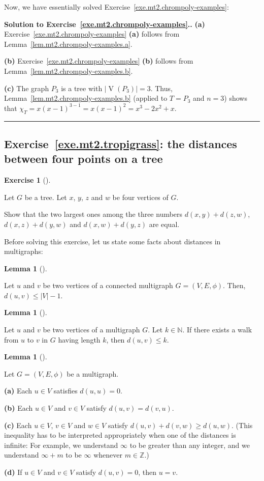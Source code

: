 \documentclass[numbers=enddot,12pt,final,onecolumn,notitlepage]{scrartcl}%
\newcounter{exer}
\theoremstyle{definition}
\newtheorem{lem}[theo]{Lemma}
\newenvironment{lemma}[1][]
{\begin{lem}[#1]\begin{leftbar}}
{\end{leftbar}\end{lem}}
\newtheorem{exmp}[exer]{Exercise}
\newenvironment{exercise}[1][]
{\begin{exmp}[#1]\begin{leftbar}}
{\end{leftbar}\end{exmp}}
\newenvironment{proof}[1][Proof]{\noindent\textbf{#1.} }{\ \rule{0.5em}{0.5em}}
\newcommand{\NN}{\mathbb{N}}
\newcommand{\ZZ}{\mathbb{Z}}
\newcommand{\abs}[1]{\left| #1 \right|}
\newcommand{\tup}[1]{\left( #1 \right)}
\newcommand{\verts}[1]{\operatorname{V}\left( #1 \right)}
\begin{document}
Now, we have essentially solved
Exercise~\ref{exe.mt2.chrompoly-examples}:

\begin{proof}[Solution to
Exercise~\ref{exe.mt2.chrompoly-examples}.]
\textbf{(a)} Exercise~\ref{exe.mt2.chrompoly-examples}
\textbf{(a)} follows from
Lemma~\ref{lem.mt2.chrompoly-examples.a}.

\textbf{(b)} Exercise~\ref{exe.mt2.chrompoly-examples}
\textbf{(b)} follows from
Lemma~\ref{lem.mt2.chrompoly-examples.b}.

\textbf{(c)} The graph $P_3$ is a tree with
$\abs{\verts{P_3}} = 3$.
Thus, Lemma~\ref{lem.mt2.chrompoly-examples.b} (applied
to $T = P_3$ and $n = 3$) shows that
$\chi_T = x \tup{x-1}^{3-1} = x \tup{x-1}^2
= x^3 - 2x^2 + x$.
\end{proof}

\subsection{Exercise~\ref{exe.mt2.tropigrass}:
the distances between four points on a tree}

\begin{exercise} \label{exe.mt2.tropigrass}
Let $G$ be a tree.
Let $x$, $y$, $z$ and $w$ be four vertices of $G$.

Show that the two largest ones among the three numbers
$d \tup{x, y} + d \tup{z, w}$,
$d \tup{x, z} + d \tup{y, w}$ and
$d \tup{x, w} + d \tup{y, z}$
are equal.
\end{exercise}

Before solving this exercise, let us state some facts about
distances in multigraphs:

\begin{lemma} \label{lem.mt2.d-leq-V}
Let $u$ and $v$ be two vertices of a connected multigraph
$G = \tup{V, E, \phi}$.
Then, $d \tup{u, v} \leq \abs{V} - 1$.
\end{lemma}

\begin{lemma} \label{lem.mt2.walk-to-distance}
Let $u$ and $v$ be two vertices of a multigraph $G$.
Let $k \in \NN$.
If there exists a walk from $u$ to $v$ in $G$ having
length $k$, then $d \tup{u, v} \leq k$.
\end{lemma}

\begin{lemma} \label{lem.mt2.distances-metric}
Let $G = \tup{V, E, \phi}$ be a multigraph.

\textbf{(a)} Each $u \in V$ satisfies $d \tup{u, u} = 0$.

\textbf{(b)} Each $u \in V$ and $v \in V$ satisfy
$d \tup{u, v} = d \tup{v, u}$.

\textbf{(c)} Each $u \in V$, $v \in V$ and $w \in V$ satisfy
$d \tup{u, v} + d \tup{v, w} \geq d \tup{u, w}$.
(This inequality has to be interpreted appropriately when one of the
distances is infinite: For example, we understand $\infty$ to be
greater than any integer, and we understand $\infty + m$ to be
$\infty$ whenever $m \in \ZZ$.)

\textbf{(d)} If $u \in V$ and $v \in V$ satisfy $d \tup{u, v} = 0$,
then $u = v$.
\end{lemma}
\end{document}
